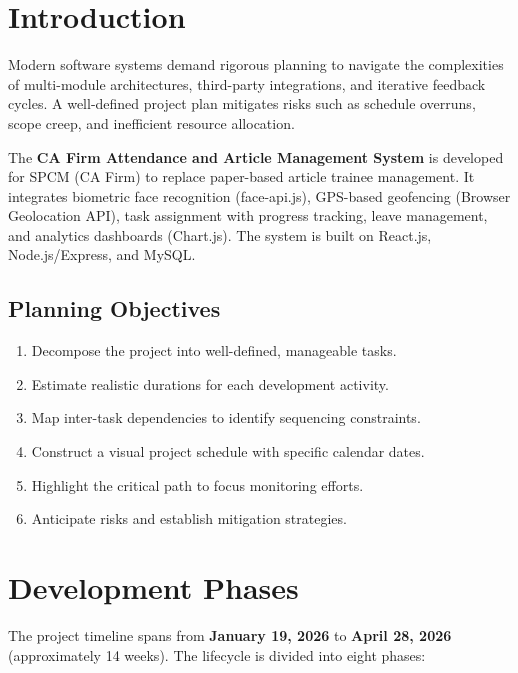 \documentclass[12pt,a4paper]{article}
\begin{document}
\section{Introduction}
Modern software systems demand rigorous planning to navigate the complexities of multi-module architectures, third-party integrations, and iterative feedback cycles. A well-defined project plan mitigates risks such as schedule overruns, scope creep, and inefficient resource allocation.

The \textbf{CA Firm Attendance and Article Management System} is developed for SPCM (CA Firm) to replace paper-based article trainee management. It integrates biometric face recognition (face-api.js), GPS-based geofencing (Browser Geolocation API), task assignment with progress tracking, leave management, and analytics dashboards (Chart.js). The system is built on React.js, Node.js/Express, and MySQL.

\subsection{Planning Objectives}
\begin{enumerate}[noitemsep, label=\roman*)]
    \item Decompose the project into well-defined, manageable tasks.
    \item Estimate realistic durations for each development activity.
    \item Map inter-task dependencies to identify sequencing constraints.
    \item Construct a visual project schedule with specific calendar dates.
    \item Highlight the critical path to focus monitoring efforts.
    \item Anticipate risks and establish mitigation strategies.
\end{enumerate}

\section{Development Phases}
The project timeline spans from \textbf{January 19, 2026} to \textbf{April 28, 2026} (approximately 14 weeks). The lifecycle is divided into eight phases:
\end{document}
